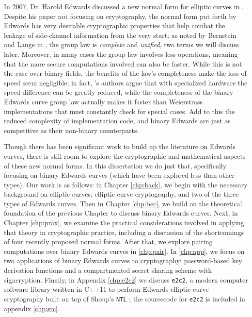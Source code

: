 In 2007, Dr. Harold Edwards discussed a new normal form for elliptic curves in
    \cite{edwards2007normal}.
Despite his paper not focusing on cryptography, the normal form put forth by
    Edwards has very desirable cryptographic properties that help combat the
    leakage of side-channel information from the very start; as noted by
    Bernstein and Lange in \cite{bernstein2007faster}, the group law is
    \textit{complete} and \textit{unified}, two terms we will discuss later.
Moreover, in many cases the group law involves less operations, meaning that
    the more secure computations involved can also be faster.
While this is not the case over binary fields, the benefits of the law's
    completeness make the loss of speed seem negligible; in fact,
    \cite{moloneyefficient}'s authors argue that with specialized hardware
    the speed difference can be greatly reduced, while the completeness of the
    binary Edwards curve group law actually makes it faster than Weierstrass
    implementations that must constantly check for special cases.
Add to this the reduced complexity of implementation code, and binary Edwards
    are just as competitive as their non-binary counterparts.

Though there has been significant work to build up the literature on Edwards
    curves, there is still room to explore the cryptographic and mathematical
    aspects of these new normal forms.
In this dissertation we do just that, specifically focusing on binary Edwards
    curves (which have been explored less than other types).
Our work is as follows: in Chapter \ref{chp:back}, we begin with the necessary
    background on elliptic curves, elliptic curve cryptography, and two of the
    three types of Edwards curves.
Then in Chapter \ref{chp:bec}, we build on the theoretical foundation of the
    previous Chapter to discuss binary Edwards curves.
Next, in Chapter \ref{chp:prax}, we examine the practical considerations
    involved in applying that theory in cryptographic practice, including a
    discussion of the shortcomings of four recently proposed normal forms.
After that, we explore pairing computations over binary Edwards curves in
    \ref{chp:pair}.
In \ref{chp:app}, we focus on two applications of binary Edwards curves to
    cryptography: password-based key derivation functions and a compartmented
    secret sharing scheme with signcryption.
Finally, in Appendix \ref{chp:e2c2} we discuss \texttt{e2c2}, a modern computer
    software library written in C++11 to perform Edwards elliptic curve
    cryptography built on top of Shoup's \texttt{NTL} \cite{shoup2009ntl}; the
    sourcecode for \texttt{e2c2} is included in appendix \ref{chp:src}.
